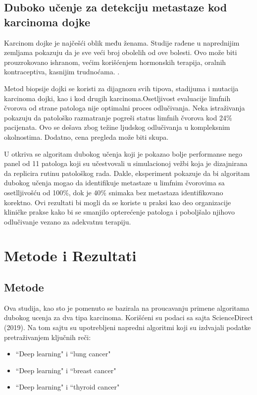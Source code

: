 \documentclass[a4paper]{article}
\begin{document}
\newpage
\subsection{Duboko učenje za detekciju metastaze kod karcinoma dojke}
\label{subsec:podnaslov2}

Karcinom dojke je najčešći oblik među ženama. Studije rađene u naprednijim zemljama pokazuju da je sve veći broj obolelih od ove bolesti. Ovo može biti prouzrokovano ishranom, većim korišćenjem hormonskih terapija, oralnih kontraceptiva, kasnijim trudnoćama. \cite{coccia2}.

Metod biopsije dojki se koristi za dijagnozu svih tipova, stadijuma i mutacija karcinoma dojki, kao i kod drugih karcinoma.Osetljivost evaluacije limfnih čvorova od strane patologa nije optimalni proces odlučivanja. Neka istraživanja pokazuju da patološko razmatranje pogreši status limfnih čvorova kod 24\% pacijenata. Ovo se dešava zbog težine ljudskog odlučivanja u kompleksnim okolnostima. Dodatno, cena pregleda može biti skupa.

U \cite{ehteshami} otkriva se algoritam dubokog učenja koji je pokazao bolje performanse nego panel od 11 patologa koji su učestvovali u simulacionoj vežbi koja je dizajnirana da replicira rutinu patološkog rada. Dakle, eksperiment pokazuje da bi algoritam dubokog učenja mogao da identifikuje metastaze u limfnim čvorovima sa osetlljivošću od 100\%, dok je 40\% snimaka bez metastaza identifikovano korektno. Ovi rezultati bi mogli da se koriste u praksi kao deo organizacije kliničke prakse kako bi se smanjilo opterećenje patologa i poboljšalo njihovo odlučivanje vezano za adekvatnu terapiju.


\newpage
\section{Metode i Rezultati}
\label{sec:analiza}



\subsection{Metode}
\label{subsec:podnaslov3}

Ova studija, kao sto je pomenuto se bazirala na proucavanju primene algoritama dubokog ucenja za dva tipa karcinoma.
Korišćeni su podaci sa sajta ScienceDirect (2019). Na tom sajtu su upotrebljeni napredni algoritmi koji su izdvajali podatke pretraživanjem ključnih reči:

\begin{itemize}
    \item ``Deep learning" i ``lung cancer"
    \item ``Deep learning" i ``breast cancer"
    \item ``Deep learning" i ``thyroid cancer"
\end{itemize}
\end{document}
